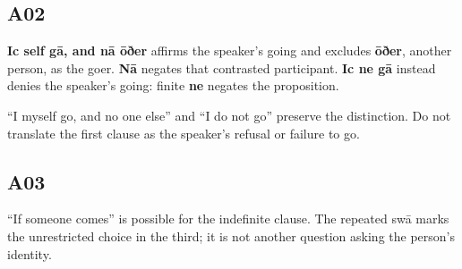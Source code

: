 \subsection*{A02}

\par\begin{minipage}{\linewidth}\raggedright
\textbf{Ic self gā, and nā ōðer} affirms the speaker’s going and excludes \textbf{ōðer}, another person, as the goer. \textbf{Nā} negates that contrasted participant. \textbf{Ic ne gā} instead denies the speaker’s going: finite \textbf{ne} negates the proposition.

“I myself go, and no one else” and “I do not go” preserve the distinction. Do not translate the first clause as the speaker’s refusal or failure to go.

\end{minipage}\par\addvspace{4pt}

\subsection*{A03}

\par\begin{minipage}{\linewidth}\raggedright



“If someone comes” is possible for the indefinite clause. The repeated swā marks the unrestricted choice in the third; it is not another question asking the person’s identity.

\end{minipage}\par\addvspace{4pt}

